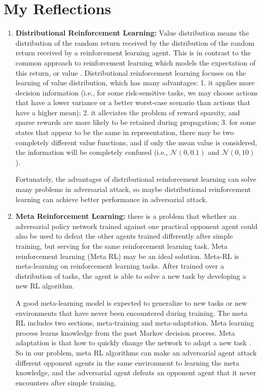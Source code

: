 \documentclass[a4paper]{article}
\begin{document}
\section{My Reflections}
\begin{enumerate}
    \item \textbf{Distributional Reinforcement Learning:} Value distribution means the distribution of the random return received by the distribution of the random return received by a reinforcement learning agent. 
    This is in contrast to the common approach to reinforcement learning which models the expectation of this return, or value \cite{bellemare_distributional_2017}. 
    Distributional reinforcement learning focuses on the learning of value distribution, which has many advantages: 1. it applies more decision information (i.e., for some risk-sensitive tasks, we may choose actions that have a lower variance or a better worst-case scenario than actions that have a higher mean); 2. it alleviates the problem of reward sparsity, and sparse rewards are more likely to be retained during propagation;
    3. for some states that appear to be the same in representation, there may be two completely different value functions, and if only the mean value is considered, the information will be completely confused (i.e., $\mathcal{N}(0,0.1)$ and $\mathcal{N}(0,10)$).

    Fortunately, the advantages of distributional reinforcement learning can solve many problems in adversarial attack, so maybe distributional reinforcement learning can achieve better performance in adversarial attack.
    \item \textbf{Meta Reinforcement Learning: }there is a problem that whether an adversarial policy network trained against one practical opponent agent could also be used to defeat the other agents trained differently after simple training, but serving for the same reinforcement learning task. 
    Meta reinforcement learning (Meta RL) may be an ideal solution. Meta-RL is meta-learning on reinforcement learning tasks. After trained over a distribution of tasks, the agent is able to solve a new task by developing a new RL algorithm.
    
    A good meta-learning model is expected to generalize to new tasks or new environments that have never been encountered during training. 
    The meta RL includes two sections, meta-training and meta-adaptation. Meta learning process learns knowledge from the past Markov decision process.
    Meta adaptation is that how to quickly change the network to adapt a new task \cite{wang2016learning}. 
    So in our problem, meta RL algorithms can make an adversarial agent attack different opponent agents in the same environment to learning the meta knowledge,
    and the adversarial agent defeats an opponent agent that it never encounters after simple training.
    

\end{enumerate}
\end{document}
